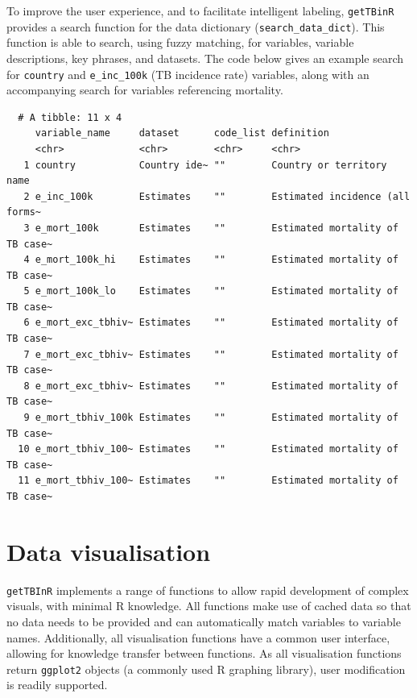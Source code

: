 \documentclass[11pt,twoside]{bristolthesis}
\begin{document}
  To improve the user experience, and to facilitate intelligent labeling, \texttt{getTBinR} provides a search function for the data dictionary (\texttt{search\_data\_dict}). This function is able to search, using fuzzy matching, for variables, variable descriptions, key phrases, and datasets. The code below gives an example search for \texttt{country} and \texttt{e\_inc\_100k} (TB incidence rate) variables, along with an accompanying search for variables referencing mortality.
  \begin{Shaded}
  \begin{Highlighting}[]
  \NormalTok{(} \NormalTok{(}\NormalTok{,}\NormalTok{),}
                    \NormalTok{(}\NormalTok{), } \NormalTok{)}
  \end{Highlighting}
  \end{Shaded}
  \begin{verbatim}
  # A tibble: 11 x 4
     variable_name     dataset      code_list definition                     
     <chr>             <chr>        <chr>     <chr>                          
   1 country           Country ide~ ""        Country or territory name      
   2 e_inc_100k        Estimates    ""        Estimated incidence (all forms~
   3 e_mort_100k       Estimates    ""        Estimated mortality of TB case~
   4 e_mort_100k_hi    Estimates    ""        Estimated mortality of TB case~
   5 e_mort_100k_lo    Estimates    ""        Estimated mortality of TB case~
   6 e_mort_exc_tbhiv~ Estimates    ""        Estimated mortality of TB case~
   7 e_mort_exc_tbhiv~ Estimates    ""        Estimated mortality of TB case~
   8 e_mort_exc_tbhiv~ Estimates    ""        Estimated mortality of TB case~
   9 e_mort_tbhiv_100k Estimates    ""        Estimated mortality of TB case~
  10 e_mort_tbhiv_100~ Estimates    ""        Estimated mortality of TB case~
  11 e_mort_tbhiv_100~ Estimates    ""        Estimated mortality of TB case~
  \end{verbatim}
  \hypertarget{getbinr-vis}{%
  \section{Data visualisation}\label{getbinr-vis}}
  
  \texttt{getTBInR} implements a range of functions to allow rapid development of complex visuals, with minimal R knowledge. All functions make use of cached data so that no data needs to be provided and can automatically match variables to variable names. Additionally, all visualisation functions have a common user interface, allowing for knowledge transfer between functions. As all visualisation functions return \texttt{ggplot2} objects (a commonly used R graphing library), user modification is readily supported.
  
\end{document}
